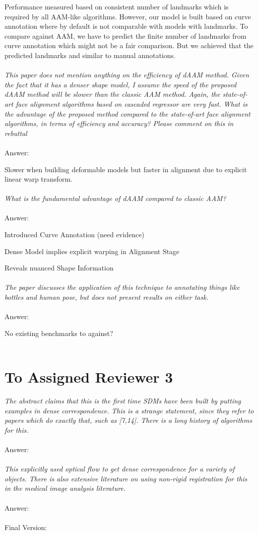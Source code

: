 Performance measured based on consistent number of landmarks which is required by all AAM-like algorithms. However, our model is built based on curve annotation where by default is not comparable with models with landmarks. To compare against AAM, we have to predict the finite number of landmarks from curve annotation which might not be a fair comparison. But we achieved that the predicted landmarks and similar to manual annotations.
\\ \\
\textit{This paper does not mention anything on the efficiency of dAAM method. Given the fact that it has a denser shape model, I assume the speed of the proposed dAAM method will be slower than the classic AAM method. Again, the state-of-art face alignment algorithms based on cascaded regressor are very fast. What is the advantage of the proposed method compared to the state-of-art face alignment algorithms, in terms of efficiency and accuracy? Please comment on this in rebuttal}
\\ \\
Answer:

Slower when building deformable models but faster in alignment due to explicit linear warp transform.
\\ \\
\textit{What is the fundamental advantage of dAAM compared to classic AAM?}
\\ \\
Answer:

Introduced Curve Annotation (need evidence)

Dense Model implies explicit warping in Alignment Stage

Reveals nuanced Shape Information
\\ \\

\textit{The paper discusses the application of this technique to annotating things like bottles and human pose, but does not present results on either task.}
\\ \\
Answer:

No existing benchmarks to against?
\\ \\
\section{To Assigned Reviewer 3}
\textit{The abstract claims that this is the first time SDMs have been built by putting examples in dense correspondence. This is a strange statement, since they refer to papers which do exactly that, such as [7,14]. There is a long history of algorithms for this.}
\\ \\
Answer:
\\ \\

\textit{This explicitly used optical flow to get dense correspondence for a variety of objects. There is also extensive literature on using non-rigid registration for this in the medical image analysis literature.}
\\ \\
Answer:
\\ \\

Final Version:


